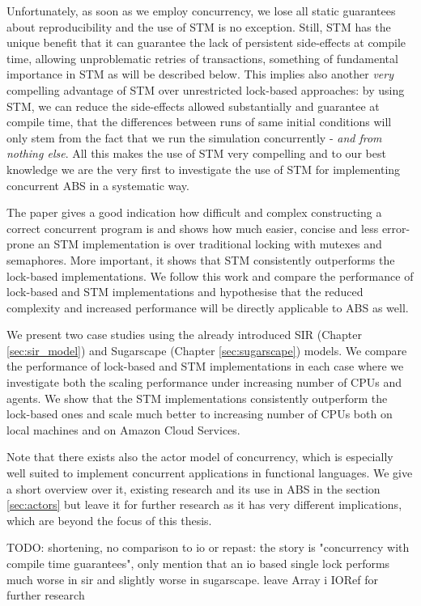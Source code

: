 Unfortunately, as soon as we employ concurrency, we lose all static guarantees about reproducibility and the use of STM is no exception. Still, STM has the unique benefit that it can guarantee the lack of persistent side-effects at compile time, allowing unproblematic retries of transactions, something of fundamental importance in STM as will be described below. This implies also another \textit{very} compelling advantage of STM over unrestricted lock-based approaches: by using STM, we can reduce the side-effects allowed substantially and guarantee at compile time, that the differences between runs of same initial conditions will only stem from the fact that we run the simulation concurrently - \textit{and from nothing else}. All this makes the use of STM very compelling and to our best knowledge we are the very first to investigate the use of STM for implementing concurrent ABS in a systematic way.

\medskip

The paper \cite{discolo_lock_2006} gives a good indication how difficult and complex constructing a correct concurrent program is and shows how much easier, concise and less error-prone an STM implementation is over traditional locking with mutexes and semaphores. More important, it shows that STM consistently outperforms the lock-based implementations. We follow this work and compare the performance of lock-based and STM implementations and hypothesise that the reduced complexity and increased performance will be directly applicable to ABS as well.

We present two case studies using the already introduced SIR (Chapter \ref{sec:sir_model}) and Sugarscape (Chapter \ref{sec:sugarscape}) models. We compare the performance of lock-based and STM implementations in each case where we investigate both the scaling performance under increasing number of CPUs and agents. We show that the STM implementations consistently outperform the lock-based ones and scale much better to increasing number of CPUs both on local machines and on Amazon Cloud Services.

Note that there exists also the actor model of concurrency, which is especially well suited to implement concurrent applications in functional languages. We give a short overview over it, existing research and its use in ABS in the section \ref{sec:actors} but leave it for further research as it has very different implications, which are beyond the focus of this thesis.

TODO: shortening, no comparison to io or repast: the story is "concurrency with compile time guarantees", only mention that an io based single lock performs much worse in sir and slightly worse in sugarscape. leave Array i IORef for further research









